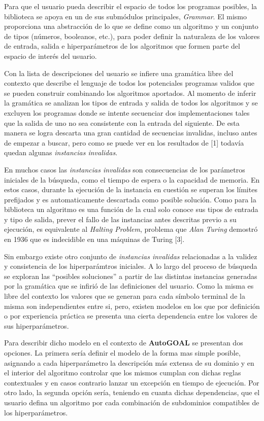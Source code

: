 Para que el usuario pueda describir el espacio de todos los programas posibles,
la biblioteca se apoya en un de sus submódulos principales, {\it Grammar}. El mismo
proporciona una abstracción de lo que se define como un algoritmo y un conjunto
de tipos (números, booleanos, etc.), para poder definir la naturaleza de los
valores de entrada, salida e hiperparámetros de los algoritmos que formen parte
del espacio de interés del usuario.

Con la lista de descripciones del usuario se infiere una gramática libre
del contexto que describe el lenguaje de todos los potenciales programas validos
que se pueden construir combinando los algoritmos aportados. Al momento de inferir
la gramática se analizan los tipos de entrada y salida de todos los algoritmos y se
excluyen los programas donde se intente secuenciar dos implementaciones tales que
la salida de uno no sea consistente con la entrada del siguiente. De esta
manera se logra descarta una gran cantidad de secuencias invalidas, incluso
antes de empezar a buscar, pero como se puede ver en los resultados de [1]
todavía quedan algunas {\it instancias invalidas}.

En muchos casos las {\it instancias invalidas} son consecuencias de los
parámetros iniciales de la búsqueda, como el tiempo de espera o la capacidad de memoria.
En estos casos, durante la ejecución de la instancia en cuestión se superan los límites
prefijados y es automaticamente descartada como posible solución. Como para la
biblioteca un algoritmo es una función de la cual solo conoce sus tipos de entrada y
tipo de salida, prever el fallo de las instancias antes descritas previo a su ejecución,
es equivalente al {\it Halting Problem}, problema que {\it Alan Turing} demostró en 1936
que es indecidible en una máquinas de Turing [3].

Sin embargo existe otro conjunto de {\it instancias invalidas} relacionadas a la validez
y consistencia de los hiperparámtros iniciales. A lo largo del proceso de búsqueda
se exploran las ``posibles soluciones'' a partir de las distintas instancias generadas
por la gramática que se infirió de las definiciones del usuario. Como la misma
es libre del contexto los valores que se generan para cada símbolo terminal de la misma
son independientes entre si, pero, existen modelos en los que por definición o por
experiencia práctica se presenta una cierta dependencia entre los valores de sus
hiperparámetros.

Para describir dicho modelo en el contexto de {\bf AutoGOAL} se presentan dos opciones.
La primera sería definir el modelo de la forma mas simple posible, asignando a cada
hiperparámetro la descripción más extensa de su dominio y en el interior del algoritmo
controlar que los mismos cumplan con dichas reglas contextuales y en casos contrario
lanzar un excepción en tiempo de ejecución. Por otro lado, la segunda opción sería, teniendo
en cuanta dichas dependencias, que el usuario defina un algoritmo por cada combinación de
subdominios compatibles de los hiperparámetros.

